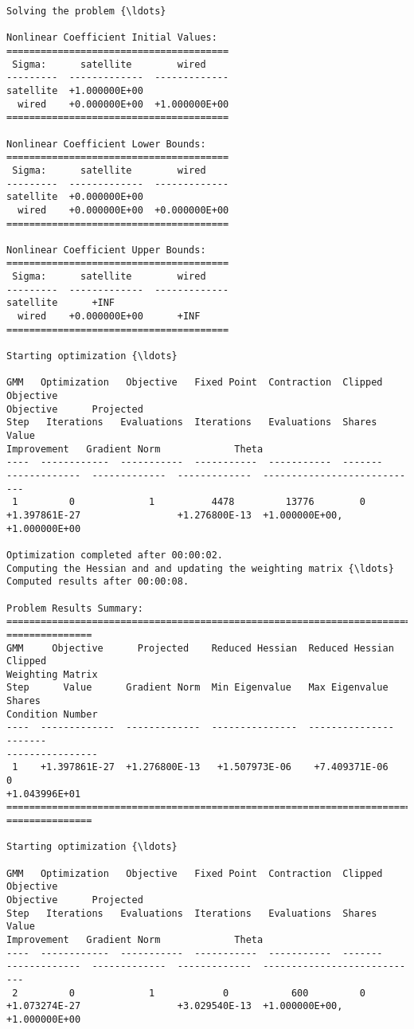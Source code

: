     \begin{Verbatim}[commandchars=\\\{\}]
Solving the problem {\ldots}

Nonlinear Coefficient Initial Values:
=======================================
 Sigma:      satellite        wired
---------  -------------  -------------
satellite  +1.000000E+00
  wired    +0.000000E+00  +1.000000E+00
=======================================

Nonlinear Coefficient Lower Bounds:
=======================================
 Sigma:      satellite        wired
---------  -------------  -------------
satellite  +0.000000E+00
  wired    +0.000000E+00  +0.000000E+00
=======================================

Nonlinear Coefficient Upper Bounds:
=======================================
 Sigma:      satellite        wired
---------  -------------  -------------
satellite      +INF
  wired    +0.000000E+00      +INF
=======================================

Starting optimization {\ldots}

GMM   Optimization   Objective   Fixed Point  Contraction  Clipped    Objective
Objective      Projected
Step   Iterations   Evaluations  Iterations   Evaluations  Shares       Value
Improvement   Gradient Norm             Theta
----  ------------  -----------  -----------  -----------  -------
-------------  -------------  -------------  ----------------------------
 1         0             1          4478         13776        0
+1.397861E-27                 +1.276800E-13  +1.000000E+00, +1.000000E+00

Optimization completed after 00:00:02.
Computing the Hessian and and updating the weighting matrix {\ldots}
Computed results after 00:00:08.

Problem Results Summary:
================================================================================
===============
GMM     Objective      Projected    Reduced Hessian  Reduced Hessian  Clipped
Weighting Matrix
Step      Value      Gradient Norm  Min Eigenvalue   Max Eigenvalue   Shares
Condition Number
----  -------------  -------------  ---------------  ---------------  -------
----------------
 1    +1.397861E-27  +1.276800E-13   +1.507973E-06    +7.409371E-06      0
+1.043996E+01
================================================================================
===============

Starting optimization {\ldots}

GMM   Optimization   Objective   Fixed Point  Contraction  Clipped    Objective
Objective      Projected
Step   Iterations   Evaluations  Iterations   Evaluations  Shares       Value
Improvement   Gradient Norm             Theta
----  ------------  -----------  -----------  -----------  -------
-------------  -------------  -------------  ----------------------------
 2         0             1            0           600         0
+1.073274E-27                 +3.029540E-13  +1.000000E+00, +1.000000E+00


\end{Verbatim}
